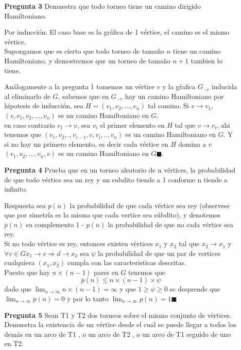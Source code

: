 \documentclass[12pt]{article}
\begin{document}
\begin{itemize}
\item[\bf{Pregunta 3}] Demuestra que todo torneo tiene un camino dirigido Hamiltoniano.
\item[Por inducción:]
      El caso base es la gráfica de 1 vértice, el camino es el mismo vértice.\\
      Supongamos que es cierto que todo torneo de tamaño $n$ tiene un camino Hamiltoniano, y demostremos que un torneo de tamaño $n+1$ tambien lo tiene.

      Análogamente a la pregunta 1 tomemos un vértice $v$ y la gŕafica $G_{-v}$ inducida al eliminarlo de $G$, sabemos que en $G_{-v}$ hay un camino Hamiltoniano por hipotesis de inducción, sea $H=(v_1,v_2,...,v_n)$ tal camino.
      Si $v \rightarrow v_{1}$, $(v,v_1,v_2,...,v_n)$ es un camino Hamiltoniano en $G$.\\
      en caso contrario $v_1 \rightarrow v$, sea $v_i$ el primer elemento en $H$ tal que $v \rightarrow v_i$, ahi tenemos que $(v_1,v_2,.,v_{i-1},v,v_i,..,v_n)$ es un camino Hamiltoniano en $G$.
      Y si no hay un primero elemento, es decir cada vértice en $H$ domina a $v$ $(v_1,v_2,...,v_n,v)$ es un camino Hamiltoniano en $G \blacksquare$.\\


\item[\bf{Pregunta 4}] Prueba que en un torneo aleatorio de n vértices, la probabilidad de que todo vértice sea un rey y un subdito tiende a 1 conforme n tiende a infinito.
\item[Respuesta] sea $p(n)$ la probabilidad de que cada vértice sea rey (observese que por simetría es la misma que cada vertice sea súbdito), y denotemos $\overline p(n)$ su complemento 1 - $p(n)$ la probabilidad de que no cada vértice sea rey.\\

Si no todo vértice es rey, entonces existen vértices $x_1$ y $x_2$ tal que $x_2 \rightarrow x_1$ y $\forall v \in G x_1 \rightarrow  v  \Rightarrow d \rightarrow x_2$
sea $\psi $ la probabilidad de que un par de vertices cualquiera $(x_1,x_2)$ cumpla con las caracteristicas descritas.\\
 Puesto que hay $n \times (n-1)$ pares en $G$ tenemos que $$\overline p(n) \leq n \times (n-1) \times \psi$$ dado que $ \lim_{n\to\infty} n \times (n-1) = \infty $ y que $ 1 \ge \psi \ge 0$ se desprende que  $ \lim_{n\to\infty} \overline p(n)=0 $ y por lo tanto $\lim_{n\to\infty} p(n)=1 \blacksquare$

\item[\bf{Pregunta 5}]Sean T1 y T2 dos torneos sobre el mismo conjunto de vértices. Demuestra la existencia de un vértice desde el cual se puede llegar a todos los demás en un arco de T1 , o un arco de T2 , o un arco de T1 seguido de uno en T2.


\end{itemize}
\end{document}
